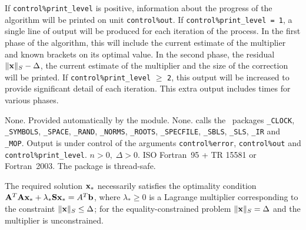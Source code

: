 \documentclass{galahad}
\newcommand{\packagename}{LLST}
\begin{document}

\galinfo
If {\tt control\%print\_level} is positive, information about the progress
of the algorithm will be printed on unit {\tt control\-\%\-out}.
If {\tt control\%print\_level = 1}, a single line of output will be produced
for each iteration of the process. In the first phase of the algorithm,
this will include the current estimate of the multiplier and known
brackets on its optimal value. In the second phase, the residual
$\|{\mathbf{x}}\|_S - \Delta$, the current estimate of the multiplier and
the size of the correction will be printed.
If {\tt control\%print\_level} $\geq$ {\tt 2}, this
output will be increased to provide significant detail of each iteration.
This extra output includes times for various phases.


\galgeneral

\galcommon None.
\galworkspace Provided automatically by the module.
\galroutines None.
\galmodules {\tt \packagename\_solve} calls the \galahad\ packages
{\tt \libraryname\_CLOCK},
{\tt \libraryname\_SY\-M\-BOLS},
{\tt \libraryname\_\-SPACE},
{\tt \libraryname\-\_\-RAND},
{\tt \libraryname\_\-NORMS},
{\tt \libraryname\_\-ROOTS},
{\tt \libraryname\_SPECFILE},
{\tt \libraryname\_SBLS},
{\tt \libraryname\_SLS},
{\tt \libraryname\_IR}
and
{\tt \libraryname\_MOP}.
\galio Output is under control of the arguments
{\tt control\%error}, {\tt control\%out} and {\tt control\%print\_level}.
\galrestrictions $n  >  0, \;  \Delta  >  0$.
\galportability ISO Fortran~95 + TR 15581 or Fortran~2003.
The package is thread-safe.


\galmethod
The required solution ${\mathbf{x}}_*$ necessarily satisfies the optimality condition
${\mathbf{A}}^T {\mathbf{A}} {\mathbf{x}}_* + \lambda_* {\mathbf{S}} {\mathbf{x}}_* = A^T {\mathbf{b}}$,
where $\lambda_* \geq 0$ is a Lagrange
multiplier corresponding to the constraint $\|{\mathbf{x}}\|_S  \leq  \Delta$;
for the equality-constrained problem $\|{\mathbf{x}}\|_S = \Delta$ and
the multiplier is unconstrained.
\end{document}
